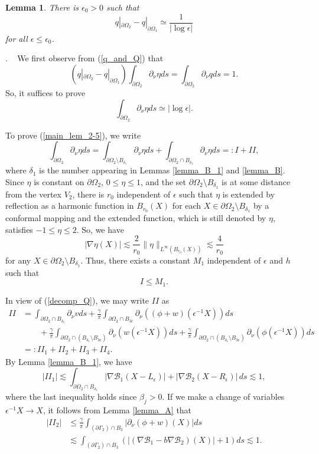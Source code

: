 \documentclass[11pt,a4paper]{article}
\numberwithin{equation}{section}
\newtheorem{lem}[thm]{Lemma}
\newcommand{\pf}{\noindent {\sl Proof}. \ }
\newcommand{\p}{\partial}
\newcommand{\norm}[1]{\| #1 \|}
\newcommand{\eqnref}[1]{(\ref {#1})}
\newcommand{\Bcal}{\mathcal{B}}
\newcommand{\Gb}{\beta}
\newcommand{\Gd}{\delta}
\newcommand{\Ge}{\epsilon}
\newcommand{\Gf}{\phi}
\newcommand{\Gg}{\gamma}
\newcommand{\Gn}{\eta}
\newcommand{\GG}{\Gamma}
\newcommand{\GO}{\Omega}
\newcommand{\beq}{\begin{equation}}
\newcommand{\eeq}{\end{equation}}
\begin{document}
\begin{lem}\label{lemma_C}
There is $\Ge_0 >0$ such that
\beq
q|_{\p \GO_2} - q|_{\p \GO_1} \simeq \frac 1 {|\log \Ge|}
\eeq
for all $\Ge \le \Ge_0$.
\end{lem}

\pf
We first observe from \eqnref{q_and_Q} that
$$
(q |_{\p \GO_2} - q|_{\p \GO_1}) \int_{\p \GO_2}  \p_{\nu} \Gn ds = \int_{\p \GO_2} \p_{\nu} q ds = 1.
$$
So, it suffices to prove
\beq\label{main_lem_2-5}
\int_{\p \GO_2}  \p_{\nu} \Gn ds \simeq  {|\log \Ge|}.
\eeq

To prove \eqnref{main_lem_2-5}, we write
\beq\label{1st+2nd_lem_2-5}
\int_{\p \GO_2} \p_{\nu} \Gn ds = \int_{\p \GO_2 \setminus B_{\Gd_1}} \p_{\nu} \Gn  ds  + \int_{\p \GO_2 \cap B_{\Gd_1}} \p_{\nu} \Gn ds =: I+II,
\eeq
where $\Gd_1$ is the number appearing in Lemmas \ref{lemma_B_1} and \ref{lemma_B}. Since $\Gn$ is constant on $\p \GO_2$, $0\le \Gn \le 1$, and the set $\p \GO_2 \setminus B_{\Gd_1}$ is at some distance from the vertex $V_2$, there is $r_0$ independent of $\Ge$ such that $\eta$ is extended by reflection as a harmonic function in $B_{r_0}(X)$ for each $X \in \p \GO_2 \setminus B_{\Gd_1}$ by a conformal mapping and the extended function, which is still denoted by $\Gn$, satisfies $-1 \le \Gn \le 2$. So, we have
$$
\left| \nabla \Gn(X) \right| \lesssim \frac{2}{r_0} \norm{\Gn}_{L^{\infty}(B_{r_0}(X))} \lesssim \frac{4}{r_0}
$$
for any $X \in \p\GO_2 \setminus B_{\Gd_1}$. Thus, there exists a constant $M_1$ independent of $\Ge$ and $h$ such that
\beq\label{I}
I \leq M_1.
\eeq

In view of \eqnref{decomp_Q}, we may write $II$ as
\begin{align*}
II & = \int_{\p \GO_2 \cap B_{\Gd_1}} \p_{\nu} v ds + \frac{\Gg}{\pi} \int_{\p \GO_2 \cap B_{3\Ge}} \p_{\nu} \left(  (\Gf + w) (\Ge^{-1} X) \right) ds\\
& \qquad + \frac{\Gg}{\pi} \int_{\p \GO_2 \cap (B_{\Gd_1} \setminus B_{3\Ge} )} \p_{\nu} \left( w (\Ge^{-1} X)\right)  ds
+ \frac{\Gg}{\pi} \int_{\p \GO_2 \cap (B_{\Gd_1} \setminus B_{3\Ge} )} \p_{\nu} \left( \Gf (\Ge^{-1} X)\right)  ds \\
&=: II_1 + II_2 + II_3 + II_4.
\end{align*}
By Lemma \ref{lemma_B_1}, we have
\beq\label{II1}
|II_1| \lesssim \int_{\p \GO_2 \cap B_{\Gd_1}} | \nabla \Bcal_1 (X-L_\Ge) | + | \nabla \Bcal_2 (X-R_\Ge) | \, ds \lesssim 1,
\eeq
where the last inequality holds since $\Gb_j >0$. If we make a change of variables $\Ge^{-1} X \to X$, it follows from Lemma \ref{lemma_A} that
\begin{align}
|II_2| &\le \frac{\Gg}{\pi} \int_{(\p \GG_2) \cap B_{3}} |\p_{\nu} (\Gf + w ) (X)| ds \nonumber \\
&\lesssim \int_{(\p \GG_2) \cap B_{3}} (|(\nabla \Bcal_1 - b \nabla \Bcal_2)(X)| + 1) ds \lesssim 1. \label{II2}
\end{align}
\end{document}
